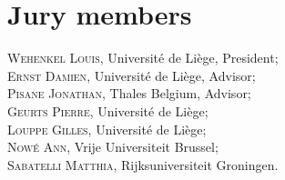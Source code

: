 
\chapter*{Jury members}

\noindent \textsc{Wehenkel Louis}, Universit{\'e} de Li{\`e}ge, President;\\

\noindent \textsc{Ernst Damien}, Universit{\'e} de Li{\`e}ge, Advisor;\\

\noindent \textsc{Pisane Jonathan}, Thales Belgium, Advisor;\\

\noindent \textsc{Geurts Pierre}, Universit{\'e} de Li{\`e}ge;\\

\noindent \textsc{Louppe Gilles}, Universit{\'e} de Li{\`e}ge;\\

\noindent \textsc{Now{\'e} Ann}, Vrije Universiteit Brussel;\\

\noindent \textsc{Sabatelli Matthia}, Rijksuniversiteit Groningen.\\